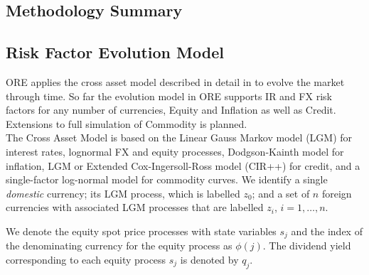 \documentclass[12pt, a4paper]{article}
\begin{document}
{%




\newpage
\begin{appendix}

\section{Methodology Summary}

\subsection{Risk Factor Evolution Model}\label{sec:app_rfe}

ORE applies the cross asset model described in detail in \cite{Lichters} to evolve  the market through time. So far the
evolution model in ORE supports IR and FX risk factors for any number of currencies, Equity and Inflation as well as Credit. Extensions to full simulation of Commodity is planned. \\

The Cross Asset Model is based on the Linear Gauss Markov model (LGM) for interest rates, lognormal FX and equity 
processes, Dodgson-Kainth model for inflation, LGM or Extended Cox-Ingersoll-Ross model (CIR++) for credit, and a single-factor log-normal model for commodity curves.
We identify a single {\em domestic} currency; its LGM process,
which is labelled $z_0$; and a set of $n$ foreign currencies with associated LGM processes that are labelled $z_i$, 
$i=1,\dots,n$. 

We denote the equity spot price processes with state variables $s_j$ and the index of the denominating 
currency for the equity process as $\phi(j)$. The dividend yield corresponding to each equity process $s_j$ is denoted 
by $q_j$.


\end{appendix}}
\end{document}
